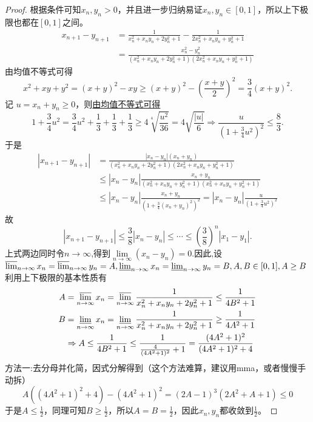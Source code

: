 \documentclass[lang=cn,newtx,10pt,scheme=chinese]{elegantbook}
\begin{document}
\begin{proof}
根据条件可知\(x_n,y_n > 0\)，并且进一步归纳易证\(x_n,y_n\in[0,1]\)，所以上下极限也都在\([0,1]\)之间。
\begin{align*}
x_{n + 1}-y_{n + 1}&=\frac{1}{x_n^2 + x_ny_n + 2y_n^2 + 1}-\frac{1}{2x_n^2 + x_ny_n + y_n^2 + 1}\\
&=\frac{x_n^2 - y_n^2}{(x_n^2 + x_ny_n + 2y_n^2 + 1)(2x_n^2 + x_ny_n + y_n^2 + 1)}
\end{align*}
由均值不等式可得
\[
x^2 + xy + y^2=(x + y)^2 - xy\geqslant (x + y)^2 - \left(\frac{x + y}{2}\right)^2=\frac{3}{4}(x + y)^2.
\]
记 \(u = x_n + y_n\geq 0\)，则\hyperlink{均值放缩的思路}{由均值不等式可得}
\[
1+\frac{3}{4}u^2=\frac{3}{4}u^2+\frac{1}{3}+\frac{1}{3}+\frac{1}{3}\geq 4\sqrt[4]{\frac{u^2}{36}}=4\sqrt{\frac{|u|}{6}}\Rightarrow \frac{u}{(1+\frac{3}{4}u^2)^2}\le \frac{8}{3}.
\]
于是
\begin{align*}
|x_{n + 1}-y_{n + 1}|&=\frac{|x_n - y_n|(x_n + y_n)}{(x_{n}^{2}+x_ny_n + 2y_{n}^{2}+1)(2x_{n}^{2}+x_ny_n + y_{n}^{2}+1)}\\
&\le |x_n - y_n|\frac{x_n + y_n}{(x_{n}^{2}+x_ny_n + y_{n}^{2}+1)(x_{n}^{2}+x_ny_n + y_{n}^{2}+1)}\\
&\le |x_n - y_n|\frac{x_n + y_n}{(1+\frac{3}{4}(x_n + y_n)^2)^2}=|x_n - y_n|\frac{u}{(1+\frac{3}{4}u^2)^2}
\end{align*}
故
\[
|x_{n + 1}-y_{n + 1}|\le \frac{3}{8}|x_n - y_n|\le \cdots \le (\frac{3}{8})^n|x_1 - y_1|.
\]
上式两边同时令$n\to \infty$,得到$\underset{n\rightarrow \infty}{\lim}\left( x_n-y_n \right) =0$.因此,设
\(\varlimsup_{n\rightarrow\infty}x_n=\varlimsup_{n\rightarrow\infty}y_n = A,\varliminf_{n\rightarrow\infty}x_n=\varliminf_{n\rightarrow\infty}y_n = B,A,B\in[0,1],A\geq B\)
利用上下极限的基本性质有
\begin{align*}
A&=\varlimsup_{n\rightarrow\infty}x_n=\varlimsup_{n\rightarrow\infty}\frac{1}{x_n^2 + x_ny_n + 2y_n^2 + 1}\leq\frac{1}{4B^2 + 1}\\
B&=\varliminf_{n\rightarrow\infty}x_n=\varliminf_{n\rightarrow\infty}\frac{1}{x_n^2 + x_ny_n + 2y_n^2 + 1}\geq\frac{1}{4A^2 + 1}\\
&\Rightarrow A\leq\frac{1}{4B^2 + 1}\leq\frac{1}{\frac{4}{(4A^2 + 1)^2}+1}=\frac{(4A^2 + 1)^2}{(4A^2 + 1)^2 + 4}
\end{align*}
{\color{blue}方法一:}去分母并化简，因式分解得到（这个方法难算，建议用mma，或者慢慢手动拆）
\[A((4A^2 + 1)^2 + 4)-(4A^2 + 1)^2=(2A - 1)^3(2A^2 + A + 1)\leq0\]
于是\(A\leq\frac{1}{2}\)，同理可知\(B\geq\frac{1}{2}\)，所以\(A = B=\frac{1}{2}\)，因此\(x_n,y_n\)都收敛到\(\frac{1}{2}\)。


\end{proof}
\end{document}
